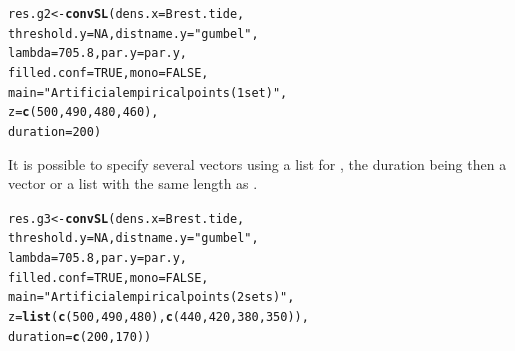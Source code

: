 \documentclass[11pt,a4paper]{report}\usepackage[]{graphicx}\usepackage[]{color}
\makeatletter
\newcommand{\hlnum}[1]{\textcolor[rgb]{0.686,0.059,0.569}{#1}}%
\newcommand{\hlstr}[1]{\textcolor[rgb]{0.192,0.494,0.8}{#1}}%
\newcommand{\hlstd}[1]{\textcolor[rgb]{0.345,0.345,0.345}{#1}}%
\newcommand{\hlkwb}[1]{\textcolor[rgb]{0.69,0.353,0.396}{#1}}%
\newcommand{\hlkwc}[1]{\textcolor[rgb]{0.333,0.667,0.333}{#1}}%
\newcommand{\hlkwd}[1]{\textcolor[rgb]{0.737,0.353,0.396}{\textbf{#1}}}%
\newenvironment{kframe}{%
 \def\at@end@of@kframe{}%
 \ifinner\ifhmode%
  \def\at@end@of@kframe{\end{minipage}}%
  \begin{minipage}{\columnwidth}%
 \fi\fi%
 \def\FrameCommand##1{\hskip\@totalleftmargin \hskip-\fboxsep
 \colorbox{shadecolor}{##1}\hskip-\fboxsep
     \hskip-\linewidth \hskip-\@totalleftmargin \hskip\columnwidth}%
 \MakeFramed {\advance\hsize-\width
   \@totalleftmargin\z@ \linewidth\hsize
   \@setminipage}}%
 {\par\unskip\endMakeFramed%
 \at@end@of@kframe}
\newenvironment{knitrout}{}{} %
\makeatother
\begin{document}
\begin{knitrout}
\color{fgcolor}\begin{kframe}
\begin{alltt}
\hlstd{res.g2} \hlkwb{<-} \hlkwd{convSL}\hlstd{(}\hlkwc{dens.x} \hlstd{= Brest.tide,}
                 \hlkwc{threshold.y} \hlstd{=} \hlnum{NA}\hlstd{,} \hlkwc{distname.y} \hlstd{=} \hlstr{"gumbel"}\hlstd{,}
                 \hlkwc{lambda} \hlstd{=} \hlnum{705.8}\hlstd{,} \hlkwc{par.y} \hlstd{= par.y,}
                 \hlkwc{filled.conf} \hlstd{=} \hlnum{TRUE}\hlstd{,} \hlkwc{mono} \hlstd{=} \hlnum{FALSE}\hlstd{,}
                 \hlkwc{main} \hlstd{=} \hlstr{"Artificial empirical points (1 set)"}\hlstd{,}
                 \hlkwc{z} \hlstd{=} \hlkwd{c}\hlstd{(}\hlnum{500}\hlstd{,} \hlnum{490}\hlstd{,} \hlnum{480}\hlstd{,} \hlnum{460}\hlstd{),}
                 \hlkwc{duration} \hlstd{=} \hlnum{200}\hlstd{)}
\end{alltt}
\end{kframe}
\end{knitrout}

\noindent
It is possible to specify several vectors using a list for \verb@z@,
the duration being then a vector or a list with the same length as
\verb@z@. 

\begin{knitrout}
\color{fgcolor}\begin{kframe}
\begin{alltt}
\hlstd{res.g3} \hlkwb{<-} \hlkwd{convSL}\hlstd{(}\hlkwc{dens.x} \hlstd{= Brest.tide,}
                 \hlkwc{threshold.y} \hlstd{=} \hlnum{NA}\hlstd{,} \hlkwc{distname.y} \hlstd{=} \hlstr{"gumbel"}\hlstd{,}
                 \hlkwc{lambda} \hlstd{=} \hlnum{705.8}\hlstd{,} \hlkwc{par.y} \hlstd{= par.y,}
                 \hlkwc{filled.conf} \hlstd{=} \hlnum{TRUE}\hlstd{,} \hlkwc{mono} \hlstd{=} \hlnum{FALSE}\hlstd{,}
                 \hlkwc{main} \hlstd{=} \hlstr{"Artificial empirical points (2 sets)"}\hlstd{,}
                 \hlkwc{z} \hlstd{=} \hlkwd{list}\hlstd{(}\hlkwd{c}\hlstd{(}\hlnum{500}\hlstd{,} \hlnum{490}\hlstd{,} \hlnum{480}\hlstd{),} \hlkwd{c}\hlstd{(}\hlnum{440}\hlstd{,} \hlnum{420}\hlstd{,} \hlnum{380}\hlstd{,} \hlnum{350}\hlstd{)),}
                 \hlkwc{duration} \hlstd{=} \hlkwd{c}\hlstd{(}\hlnum{200}\hlstd{,} \hlnum{170}\hlstd{))}
\end{alltt}
\end{kframe}
\end{knitrout}
\end{document}
